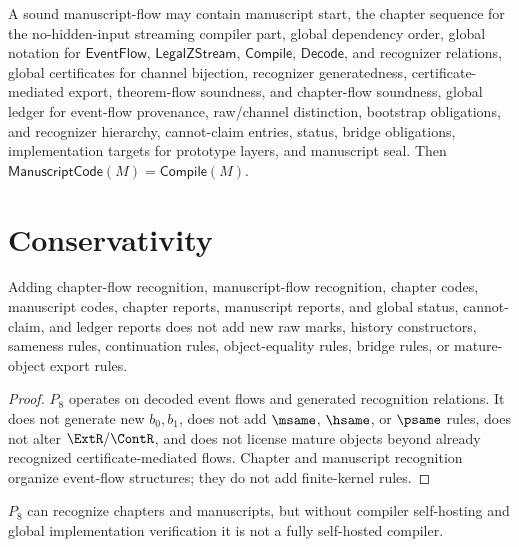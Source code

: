 \begin{example}
\label{ex:chapter-manuscript-sound-manuscript-flow}
A sound manuscript-flow may contain manuscript start, the chapter sequence for the no-hidden-input streaming compiler part, global dependency order, global notation for $\mathsf{EventFlow}$, $\mathsf{LegalZStream}$, $\mathsf{Compile}$, $\mathsf{Decode}$, and recognizer relations, global certificates for channel bijection, recognizer generatedness, certificate-mediated export, theorem-flow soundness, and chapter-flow soundness, global ledger for event-flow provenance, raw/channel distinction, bootstrap obligations, and recognizer hierarchy, cannot-claim entries, status, bridge obligations, implementation targets for prototype layers, and manuscript seal. Then $\mathsf{ManuscriptCode}(M)=\mathsf{Compile}(M)$.
\end{example}

\section{Conservativity}
\label{sec:chapter-manuscript-conservativity}

\begin{theorem}
\label{thm:chapter-manuscript-p8-conservative}
Adding chapter-flow recognition, manuscript-flow recognition, chapter codes, manuscript codes, chapter reports, manuscript reports, and global status, cannot-claim, and ledger reports does not add new raw marks, history constructors, sameness rules, continuation rules, object-equality rules, bridge rules, or mature-object export rules.
\end{theorem}

\begin{proof}
$P_8$ operates on decoded event flows and generated recognition relations. It does not generate new $b_0,b_1$, does not add $\msame$, $\hsame$, or $\psame$ rules, does not alter $\ExtR/\ContR$, and does not license mature objects beyond already recognized certificate-mediated flows. Chapter and manuscript recognition organize event-flow structures; they do not add finite-kernel rules.
\end{proof}

\begin{corollary}
\label{cor:chapter-manuscript-p8-not-self-hosting}
$P_8$ can recognize chapters and manuscripts, but without compiler self-hosting and global implementation verification it is not a fully self-hosted compiler.
\end{corollary}

